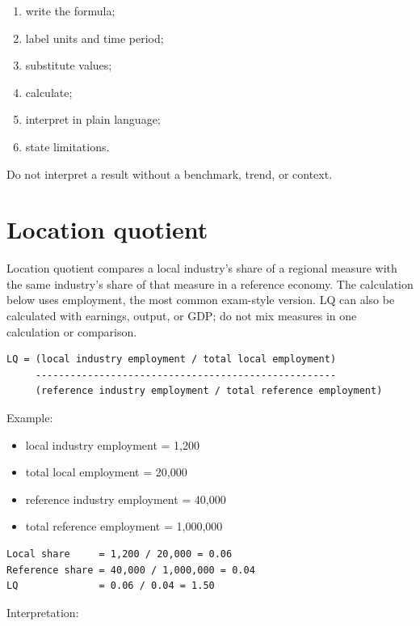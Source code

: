\documentclass[11pt,letterpaper,oneside,openany]{book}
\begin{document}
\begin{enumerate}
\item write the formula;
\item label units and time period;
\item substitute values;
\item calculate;
\item interpret in plain language;
\item state limitations.
\end{enumerate}


Do not interpret a result without a benchmark, trend, or context.


\section[Location quotient]{Location quotient}
Location quotient compares a local industry's share of a regional measure with the same industry's share of that measure in a reference economy. The calculation below uses employment, the most common exam-style version. LQ can also be calculated with earnings, output, or GDP; do not mix measures in one calculation or comparison.


\begin{Verbatim}[fontsize=\small,breaklines=true,breakanywhere=true,frame=single,framesep=2mm]
LQ = (local industry employment / total local employment)
     ----------------------------------------------------
     (reference industry employment / total reference employment)
\end{Verbatim}

Example:


\begin{itemize}
\item local industry employment = 1,200
\item total local employment = 20,000
\item reference industry employment = 40,000
\item total reference employment = 1,000,000
\end{itemize}


\begin{Verbatim}[fontsize=\small,breaklines=true,breakanywhere=true,frame=single,framesep=2mm]
Local share     = 1,200 / 20,000 = 0.06
Reference share = 40,000 / 1,000,000 = 0.04
LQ              = 0.06 / 0.04 = 1.50
\end{Verbatim}

Interpretation:
\end{document}
